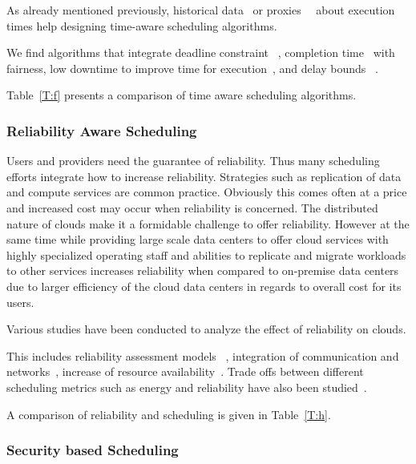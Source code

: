 \documentclass[final,5p,times,twocolumn]{elsarticle}
\newcommand{\TODO}[1]{\todo[inline]{#1}}
\begin{document}
\TODO{THIS REFERNCE DOES NOT EXIST}

As already mentioned previously, historical
data~\cite{thomas2015credit} or proxies~~\cite{erdil2013autonomic}
about execution times help designing time-aware scheduling algorithms.

We find algorithms that integrate
deadline constraint ~\cite{li2016energy}, 
completion time~\cite{xu2011job} with fairness,
low downtime to improve time for execution~\cite{frincu2014scheduling},
and 
delay bounds 
~\cite{yuan2017time}.

Table~\ref{T:f} presents a comparison of time aware
scheduling algorithms.



\subsubsection{Reliability Aware Scheduling}\label{sec:reliability}



Users and providers need the guarantee of reliability. Thus many
scheduling efforts integrate how to increase reliability. Strategies
such as replication of data and compute services are common
practice. Obviously this comes often at a price and increased cost may
occur when reliability is concerned. The distributed nature of clouds
make it a formidable challenge to offer reliability. However at the
same time while providing large scale data centers to offer cloud
services with highly specialized operating staff and abilities to
replicate and migrate workloads to other services increases
reliability when compared to on-premise data centers due to larger
efficiency of the cloud data centers in regards to overall cost for
its users.

Various studies have been conducted to analyze the effect of reliability on clouds.

This includes reliability assessment models
~\cite{malik2012reliability}, integration of communication and
networks~\cite{jing2015reliability}, increase of resource
availability~\cite{latiff2016fault}. Trade offs between different
scheduling metrics such as energy and reliability have also been
studied~\cite{tang2016energy}.

A comparison of reliability and scheduling is given in Table~\ref{T:h}.





\subsubsection{Security based Scheduling}\label{sec:security}
\end{document}
